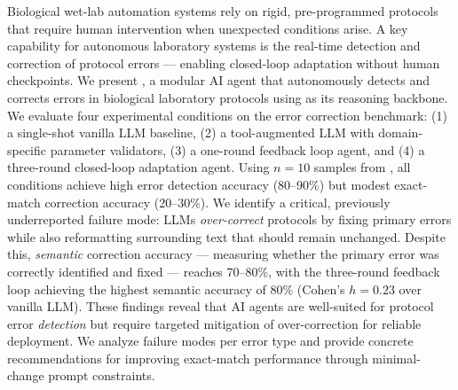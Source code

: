 Biological wet-lab automation systems rely on rigid, pre-programmed protocols that require human intervention when unexpected conditions arise.
A key capability for autonomous laboratory systems is the real-time detection and correction of protocol errors --- enabling closed-loop adaptation without human checkpoints.
We present \wetlabagent, a modular AI agent that autonomously detects and corrects errors in biological laboratory protocols using \claude as its reasoning backbone.
We evaluate four experimental conditions on the \bioprobench error correction benchmark: (1) a single-shot vanilla LLM baseline, (2) a tool-augmented LLM with domain-specific parameter validators, (3) a one-round feedback loop agent, and (4) a three-round closed-loop adaptation agent.
Using $n=10$ samples from \bioprobench, all conditions achieve high error detection accuracy (80--90\%) but modest exact-match correction accuracy (20--30\%).
We identify a critical, previously underreported failure mode: LLMs \emph{over-correct} protocols by fixing primary errors while also reformatting surrounding text that should remain unchanged.
Despite this, \emph{semantic} correction accuracy --- measuring whether the primary error was correctly identified and fixed --- reaches 70--80\%, with the three-round feedback loop achieving the highest semantic accuracy of 80\% (Cohen's $h = 0.23$ over vanilla LLM).
These findings reveal that AI agents are well-suited for protocol error \emph{detection} but require targeted mitigation of over-correction for reliable deployment.
We analyze failure modes per error type and provide concrete recommendations for improving exact-match performance through minimal-change prompt constraints.

